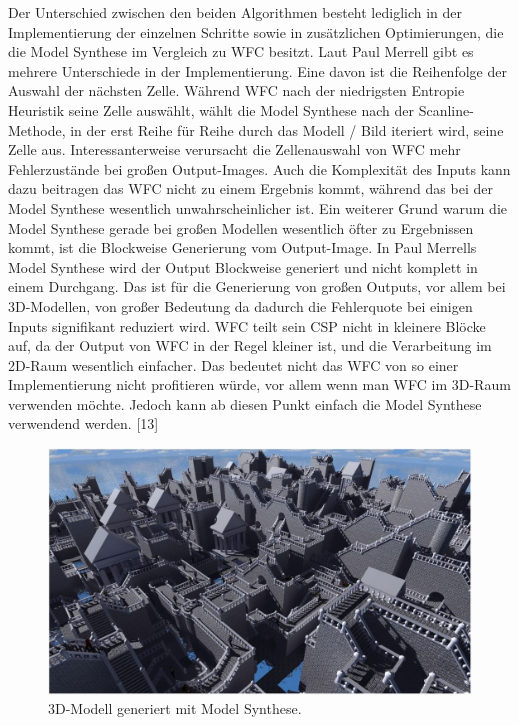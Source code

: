 \documentclass[12pt]{report}
\begin{document}
Der Unterschied zwischen den beiden Algorithmen besteht lediglich in der Implementierung der einzelnen Schritte sowie in zusätzlichen Optimierungen,
die die Model Synthese im Vergleich zu WFC besitzt.
Laut Paul Merrell gibt es mehrere Unterschiede in der Implementierung.
\newline
Eine davon ist die Reihenfolge der Auswahl der nächsten Zelle.
Während WFC nach der niedrigsten Entropie Heuristik seine Zelle auswählt,
wählt die Model Synthese nach der Scanline-Methode, in der erst Reihe für Reihe durch das Modell / Bild iteriert wird, seine Zelle aus.
Interessanterweise verursacht die Zellenauswahl von WFC mehr Fehlerzustände bei großen Output-Images.
Auch die Komplexität des Inputs kann dazu beitragen das WFC nicht zu einem Ergebnis kommt, während das bei der Model Synthese wesentlich unwahrscheinlicher ist.
\newline
Ein weiterer Grund warum die Model Synthese gerade bei großen Modellen wesentlich öfter zu Ergebnissen kommt, ist die Blockweise Generierung vom Output-Image.
In Paul Merrells Model Synthese wird der Output Blockweise generiert und nicht komplett in einem Durchgang.
Das ist für die Generierung von großen Outputs, vor allem bei 3D-Modellen, von großer Bedeutung da dadurch die Fehlerquote bei einigen Inputs signifikant reduziert wird.
WFC teilt sein CSP nicht in kleinere Blöcke auf, da der Output von WFC in der Regel kleiner ist, und die Verarbeitung im 2D-Raum wesentlich einfacher.
Das bedeutet nicht das WFC von so einer Implementierung nicht profitieren würde, vor allem wenn man WFC im 3D-Raum verwenden möchte.
Jedoch kann ab diesen Punkt einfach die Model Synthese verwendend werden. {[13]}

\begin{figure}[H]
    \centering
    \includegraphics[width=1\linewidth]{images/3D-model-synthese.JPG}%
    \caption{3D-Modell generiert mit Model Synthese.}%
\end{figure}
\end{document}

